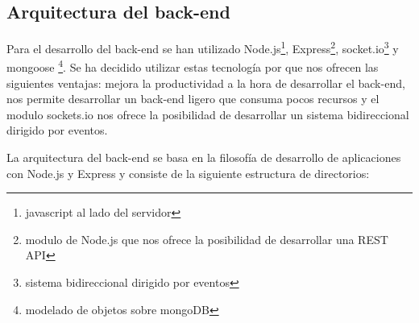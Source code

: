 \subsection{Arquitectura del back-end}


Para el desarrollo del back-end se han utilizado Node.js\footnote{javascript al lado del servidor}, Express\footnote{modulo de Node.js que nos ofrece la posibilidad de desarrollar una REST API}, socket.io\footnote{sistema bidireccional dirigido por eventos} y mongoose \footnote{modelado de objetos sobre mongoDB}. Se ha decidido utilizar estas tecnología por que nos ofrecen las siguientes ventajas: mejora la productividad a la hora de desarrollar el back-end, nos permite desarrollar un back-end ligero que consuma pocos recursos y el modulo sockets.io nos ofrece la posibilidad de desarrollar un sistema bidireccional dirigido por eventos.

La arquitectura del back-end se basa en la filosofía de desarrollo de aplicaciones con Node.js y Express y consiste de la siguiente estructura de directorios:


\newpage

